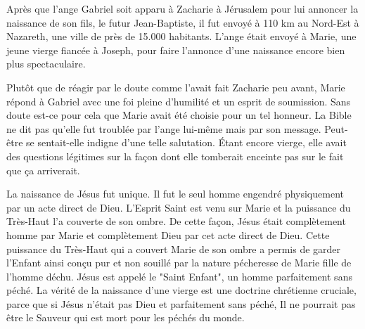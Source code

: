 

Après que l'ange Gabriel soit apparu à Zacharie à Jérusalem pour lui annoncer la naissance de son fils, le futur Jean-Baptiste, il fut envoyé à 110 km au Nord-Est à Nazareth, une ville de près de 15.000 habitants. L'ange était envoyé à Marie, une jeune vierge fiancée à Joseph, pour faire l'annonce d'une naissance encore bien plus spectaculaire.

Plutôt que de réagir par le doute comme l'avait fait Zacharie peu avant, Marie répond à Gabriel avec une foi pleine d'humilité et un esprit de soumission. Sans doute est-ce pour cela que Marie avait été choisie pour un tel honneur. La Bible ne dit pas qu'elle fut troublée par l'ange lui-même mais par son message. Peut-être se sentait-elle indigne d'une telle salutation. Étant encore vierge, elle avait des questions légitimes sur la façon dont elle tomberait enceinte pas sur le fait que ça arriverait.

La naissance de Jésus fut unique. Il fut le seul homme engendré physiquement par un acte direct de Dieu. L'Esprit Saint est venu sur Marie et la puissance du Très-Haut l'a couverte de son ombre. De cette façon, Jésus était complètement homme par Marie et complètement Dieu par cet acte direct de Dieu. Cette puissance du Très-Haut qui a couvert Marie de son ombre a permis de garder l'Enfant ainsi conçu pur et non souillé par la nature pécheresse de Marie fille de l'homme déchu. Jésus est appelé le "Saint Enfant", un homme parfaitement sans péché. La vérité de la naissance d'une vierge est une doctrine chrétienne cruciale, parce que si Jésus n'était pas Dieu et parfaitement sans péché, Il ne pourrait pas être le Sauveur qui est mort pour les péchés du monde.



